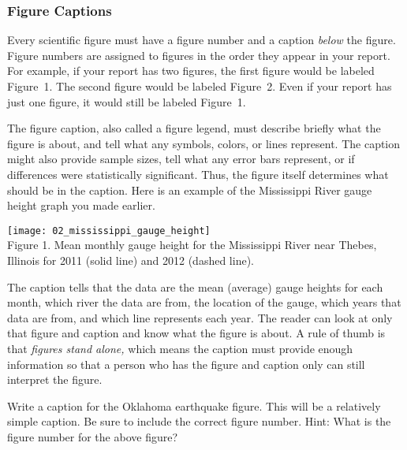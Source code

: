 \documentclass[12pt, hidelinks]{exam}
\begin{document}
\begin{questions}
\subsubsection*{Figure Captions}

Every scientific figure must have a figure number and a caption 
\emph{below} the figure. Figure numbers are assigned to figures 
in the order they appear in your report. For example, if your 
report has two figures, the first figure would be labeled Figure~1.
The second figure would be labeled Figure~2.
Even if your report has just one figure, it would still be labeled
Figure~1. 

The figure caption, also called a figure legend, must describe 
briefly what the figure is about, and tell what any symbols, 
colors, or lines represent. The caption might also 
provide sample sizes, tell what any error bars represent, or 
if differences were statistically significant. Thus, the 
figure itself determines what should be in the caption. 
Here is an example of the Mississippi River gauge height graph you 
made earlier.

\vspace*{0.5\baselineskip}

\hfil%
\begin{minipage}{0.75\textwidth}
	\texttt{[image: 02\_mississippi\_gauge\_height]}\\
	Figure 1. Mean monthly gauge height for the Mississippi River near 
	Thebes, Illinois for 2011 (solid line) and 2012 (dashed line). 
\end{minipage}%
\hfil

\vspace{0.5\baselineskip}

The caption tells that the data are the mean (average) gauge heights for 
each month, which river the data are from, the location of the
gauge, which years that data are from, and which line represents each 
year. The reader can look at only that figure and caption and know what
the figure is about. A rule of thumb is that \emph{figures stand alone,} which means 
the caption must provide enough information so that a person who 
has the figure and caption only can still interpret the figure. 



\newpage

\question
Write a caption for the Oklahoma earthquake figure. This will be 
a relatively simple caption. Be sure to include the correct figure 
number. Hint: What is the figure number for the above figure?


\end{questions}
\end{document}
